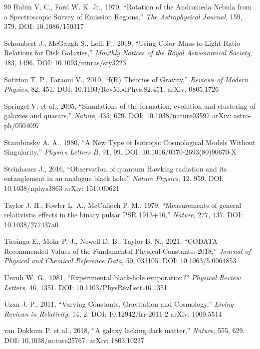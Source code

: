 \documentclass[11pt,a4paper]{article}
\begin{document}
{\begin{thebibliography}{99}
Rubin V. C., Ford W. K. Jr., 1970, ``Rotation of the Andromeda Nebula from a Spectroscopic Survey of Emission Regions,'' \emph{The Astrophysical Journal}, 159, 379. DOI: 10.1086/150317

Schombert J., McGaugh S., Lelli F., 2019, ``Using Color--Mass-to-Light Ratio Relations for Disk Galaxies,'' \emph{Monthly Notices of the Royal Astronomical Society}, 483, 1496. DOI: 10.1093/mnras/sty3223

Sotiriou T. P., Faraoni V., 2010, ``f(R) Theories of Gravity,'' \emph{Reviews of Modern Physics}, 82, 451. DOI: 10.1103/RevModPhys.82.451. arXiv: 0805.1726

Springel V. et al., 2005, ``Simulations of the formation, evolution and clustering of galaxies and quasars,'' \emph{Nature}, 435, 629. DOI: 10.1038/nature03597 arXiv: astro-ph/0504097

Starobinsky A. A., 1980, ``A New Type of Isotropic Cosmological Models Without Singularity,'' \emph{Physics Letters B}, 91, 99. DOI: 10.1016/0370-2693(80)90670-X

Steinhauer J., 2016, ``Observation of quantum Hawking radiation and its entanglement in an analogue black hole,'' \emph{Nature Physics}, 12, 959. DOI: 10.1038/nphys3863 arXiv: 1510.00621

Taylor J. H., Fowler L. A., McCulloch P. M., 1979, ``Measurements of general relativistic effects in the binary pulsar PSR 1913+16,'' \emph{Nature}, 277, 437. DOI: 10.1038/277437a0

Tiesinga E., Mohr P. J., Newell D. B., Taylor B. N., 2021, ``CODATA Recommended Values of the Fundamental Physical Constants: 2018,'' \emph{Journal of Physical and Chemical Reference Data}, 50, 033105. DOI: 10.1063/5.0064853

Unruh W. G., 1981, ``Experimental black-hole evaporation?'' \emph{Physical Review Letters}, 46, 1351. DOI: 10.1103/PhysRevLett.46.1351

Uzan J.-P., 2011, ``Varying Constants, Gravitation and Cosmology,'' \emph{Living Reviews in Relativity}, 14, 2. DOI: 10.12942/lrr-2011-2 arXiv: 1009.5514

van Dokkum P. et al., 2018, ``A galaxy lacking dark matter,'' \emph{Nature}, 555, 629. DOI: 10.1038/nature25767. arXiv: 1803.10237


\end{thebibliography}}
\end{document}
